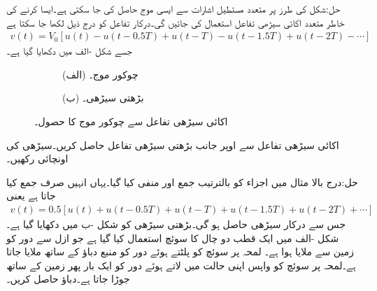 حل:شکل  کی طرز پر متعدد مستطیل اشارات سے ایسی موج حاصل کی جا سکتی ہے۔ایسا کرنے کی خاطر متعدد اکائی سیڑھی تفاعل استعمال کی جائیں گی۔درکار تفاعل کو درج ذیل لکھا جا سکتا ہے
\begin{align*}
v(t)=V_0\left[u(t)-u(t-0.5T)+u(t-T)-u(t-1.5T)+u(t-2T)-\cdots\right]
\end{align*}
جسے شکل -الف میں دکھایا گیا ہے۔
\begin{figure}
\centering
\begin{subfigure}{0.5\textwidth}
\centering
{}
\caption*{(الف) چوکور موج۔}
\end{subfigure}
\begin{subfigure}{0.5\textwidth}
\centering
{}
\caption*{(ب) بڑھتی سیڑھی۔}
\end{subfigure}
\caption{اکائی سیڑھی تفاعل سے چوکور موج کا حصول۔}
\label{شکل_عارضی_اکائی_سے_چکور}
\end{figure}
اکائی سیڑھی تفاعل سے اوپر جانب بڑھتی سیڑھی تفاعل حاصل کریں۔سیڑھی کی اونچائی  رکھیں۔

حل:درج بالا مثال میں اجزاء کو بالترتیب جمع اور منفی کیا گیا۔یہاں انہیں صرف جمع کیا جاتا ہے یعنی
\begin{align*}
v(t)=0.5\left[u(t)+u(t-0.5T)+u(t-T)+u(t-1.5T)+u(t-2T)+\cdots\right]
\end{align*}
جس سے درکار سیڑھی حاصل ہو گی۔بڑھتی سیڑھی کو شکل -ب میں دکھایا گیا ہے۔   
شکل -الف میں ایک قطب دو چال کا سوئچ استعمال کیا گیا ہے جو ازل سے دور کو زمین سے ملایا ہوا ہے۔ لمحہ  پر سوئچ کو پلٹتے ہوئے دور کو منبع دباؤ کے ساتھ ملایا جاتا ہے۔لمحہ  پر سوئچ کو واپس اپنی حالت میں لاتے ہوئے دور کو ایک بار پھر زمین کے ساتھ جوڑا جاتا ہے۔دباؤ  حاصل کریں۔

